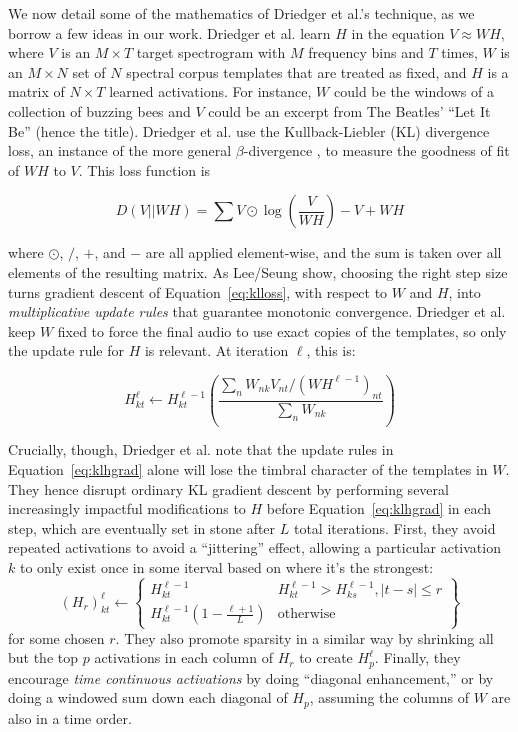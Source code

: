 \documentclass{article}
\begin{document}
We now detail some of the mathematics of Driedger et al.'s technique, as we borrow a few ideas in our work.  Driedger et al. learn $H$ in the equation $V \approx WH$, where $V$ is an $M \times T$ target spectrogram with $M$ frequency bins and $T$ times, $W$ is an $M \times N$ set of $N$ spectral corpus templates that are treated as fixed, and $H$ is a matrix of $N \times T$ learned activations.  For instance, $W$ could be the windows of a collection of buzzing bees and $V$ could be an excerpt from The Beatles' ``Let It Be'' (hence the title).  Driedger et al. use the Kullback-Liebler (KL) divergence loss, an instance of the more general $\beta$-divergence \cite{buch2017nichtnegativematrixfaktorisierungnutzendesklangsynthesensystem}, to measure the goodness of fit of $WH$ to $V$.  This loss function is 

\begin{equation}
\label{eq:klloss}
D(V || WH) = \sum V \odot \log \left( \frac{V}{WH} \right) - V + WH
\end{equation}

where $\odot$, $/$, $+$, and $-$ are all applied element-wise, and the sum is taken over all elements of the resulting matrix.  As Lee/Seung show, choosing the right step size turns gradient descent of Equation~\ref{eq:klloss}, with respect to $W$ and $H$, into {\em multiplicative update rules} that guarantee monotonic convergence.  Driedger et al. keep $W$ fixed to force the final audio to use exact copies of the templates, so only the update rule for $H$ is relevant.  At iteration $\ell$, this is:

\begin{equation}
\label{eq:klhgrad}
H_{kt}^{\ell} \gets H_{kt}^{\ell-1} \left( \frac{ \sum_{n} W_{nk} V_{nt} / (WH^{\ell-1})_{nt} }{ \sum_{n} W_{nk} } \right)
\end{equation}

Crucially, though, Driedger et al. note that the update rules in Equation~\ref{eq:klhgrad} alone will lose the timbral character of the templates in $W$.  They hence disrupt ordinary KL gradient descent by performing several increasingly impactful modifications to $H$ before Equation~\ref{eq:klhgrad} in each step, which are eventually set in stone after $L$ total iterations.  First, they avoid repeated activations to avoid a ``jittering'' effect, allowing a particular activation $k$ to only exist once in some iterval based on where it's the strongest:
\begin{equation}
    \label{eq:driedgerrepeated}
    (H_r)_{kt}^{\ell} \gets \left\{ \begin{array}{cc} H^{\ell-1}_{kt} & H^{\ell-1}_{kt} > H^{\ell-1}_{ks}, |t - s| \leq r \\ H^{\ell-1}_{kt} (1 - \frac{\ell+1}{L}) & \text{otherwise}  \end{array} \right\}
\end{equation}
for some chosen $r$.  They also promote sparsity in a similar way by shrinking all but the top $p$ activations in each column of $H_r$ to create $H_p^{\ell}$.  Finally, they encourage {\em time continuous activations} by doing ``diagonal enhancement,'' or by doing a windowed sum down each diagonal of $H_p$, assuming the columns of $W$ are also in a time order.
\end{document}
